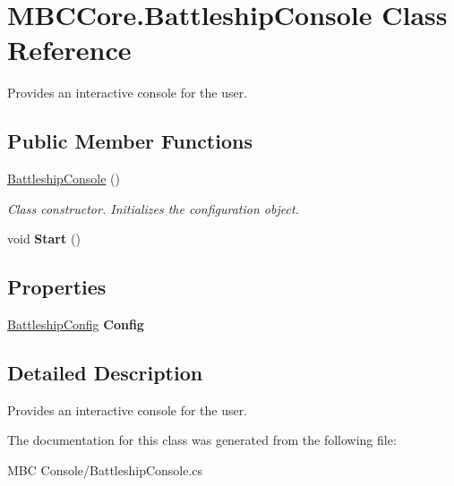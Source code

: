 \hypertarget{class_m_b_c_core_1_1_battleship_console}{\section{M\-B\-C\-Core.\-Battleship\-Console Class Reference}
\label{class_m_b_c_core_1_1_battleship_console}
}


Provides an interactive console for the user. 


\subsection*{Public Member Functions}
\begin{DoxyCompactItemize}
\item 
\hypertarget{class_m_b_c_core_1_1_battleship_console_af4eabb881ce68e7ce112cdcddbbb8316}{\hyperlink{class_m_b_c_core_1_1_battleship_console_af4eabb881ce68e7ce112cdcddbbb8316}{Battleship\-Console} ()}\label{class_m_b_c_core_1_1_battleship_console_af4eabb881ce68e7ce112cdcddbbb8316}

\begin{DoxyCompactList}\small\item\em Class constructor. Initializes the configuration object.\end{DoxyCompactList}\item 
\hypertarget{class_m_b_c_core_1_1_battleship_console_a4a6087cc9b55446a82df3ea2cf0aaeda}{void {\bfseries Start} ()}\label{class_m_b_c_core_1_1_battleship_console_a4a6087cc9b55446a82df3ea2cf0aaeda}

\end{DoxyCompactItemize}
\subsection*{Properties}
\begin{DoxyCompactItemize}
\item 
\hypertarget{class_m_b_c_core_1_1_battleship_console_a952345ccb12ba0891156cad4d09bb189}{\hyperlink{class_m_b_c_core_1_1_battleship_config}{Battleship\-Config} {\bfseries Config}}\label{class_m_b_c_core_1_1_battleship_console_a952345ccb12ba0891156cad4d09bb189}

\end{DoxyCompactItemize}


\subsection{Detailed Description}
Provides an interactive console for the user.

The documentation for this class was generated from the following file\-:\begin{DoxyCompactItemize}
\item 
M\-B\-C Console/Battleship\-Console.\-cs\end{DoxyCompactItemize}
